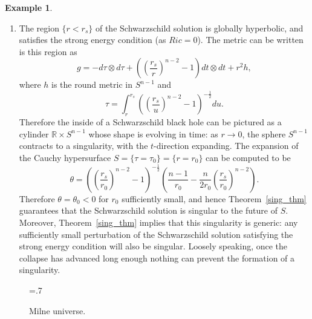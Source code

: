 \documentclass[12pt]{amsart}
\newcommand{\bbR}{\mathbb{R}}      %
\theoremstyle{definition}
\newtheorem{Example}[Thm]{Example}
\theoremstyle{remark}
\begin{document}
\begin{Example}
\begin{enumerate}
\item
The region $\{ r < r_s \}$ of the Schwarzschild solution is globally hyperbolic, and satisfies the strong energy condition (as $Ric=0$). The metric can be written is this region as
\[
g = - d\tau \otimes d\tau + \left( \left(\frac{r_s}r \right)^{n-2} - 1 \right) dt \otimes dt + r^2 h,
\]
where $h$ is the round metric in $S^{n-1}$ and
\[
\tau = \int_r^{r_s} \left( \left(\frac{r_s}u \right)^{n-2} - 1 \right)^{-\frac12} du.
\]
Therefore the inside of a Schwarzschild black hole can be pictured as a cylinder $\bbR \times S^{n-1}$ whose shape is evolving in time: as $r \to 0$, the sphere $S^{n-1}$ contracts to a singularity, with the $t$-direction expanding. The expansion of the Cauchy hypersurface $S = \{ \tau=\tau_0 \} = \{ r=r_0 \}$ can be computed to be
\[
\theta = \left( \left(\frac{r_s}{r_0} \right)^{n-2} - 1 \right)^{-\frac12}\left( \frac{n-1}{r_0} - \frac{n}{2r_0} \left(\frac{r_s}{r_0} \right)^{n-2} \right).
\]
Therefore $\theta = \theta_0 < 0$ for $r_0$ sufficiently small, and hence Theorem~\ref{sing_thm} guarantees that the Schwarzschild solution is singular to the future of $S$. Moreover, Theorem~\ref{sing_thm} implies that this singularity is generic: any sufficiently small perturbation of the Schwarzschild solution satisfying the strong energy condition will also be singular. Loosely speaking, once the collapse has advanced long enough nothing can prevent the formation of a singularity.
\end{enumerate}
\end{Example}

\begin{figure}[h!]
\begin{center}
\epsfxsize=.7\textwidth
\leavevmode
{}
\end{center}
\caption{Milne universe.} \label{Milne}
\end{figure}
%
%
\end{document}
